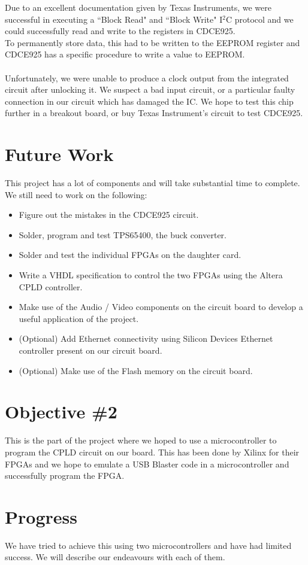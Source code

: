\documentclass[11pt]{article}
\begin{document}
Due to an excellent documentation given by Texas Instruments, we were successful in executing a ``Block Read" and ``Block Write" I$^2$C protocol and we could successfully read and write to the registers in CDCE925.\\
To permanently store data, this had to be written to the EEPROM register and CDCE925 has a specific procedure to write a value to EEPROM.\\\\
Unfortunately, we were unable to produce a clock output from the integrated circuit after unlocking it. We suspect a bad input circuit, or a particular faulty connection in our circuit which has damaged the IC. We hope to test this chip further in a breakout board, or  buy Texas Instrument's circuit to test CDCE925.

\section*{Future Work}
This project has a lot of components and will take substantial time to complete. We still need to work on the following:
\begin{itemize}
\item Figure out the mistakes in the CDCE925 circuit.
\item Solder, program and test TPS65400, the buck converter.
\item Solder and test the individual FPGAs on the daughter card.
\item Write a VHDL specification to control the two FPGAs using the Altera CPLD controller.
\item Make use of the Audio / Video components on the circuit board to develop a useful application of the project.
\item (Optional) Add Ethernet connectivity using Silicon Devices Ethernet controller present on our circuit board.
\item (Optional) Make use of the Flash memory on the circuit board.
\end{itemize}
\pagebreak
\section*{Objective \#2}
This is the part of the project where we hoped to use a microcontroller to program the CPLD circuit on our board. This has been done by Xilinx for their FPGAs and we hope to emulate a USB Blaster code in a microcontroller and successfully program the FPGA.
\section*{Progress}
We have tried to achieve this using two microcontrollers and have had limited success. We will describe our endeavours with each of them.
\end{document}
